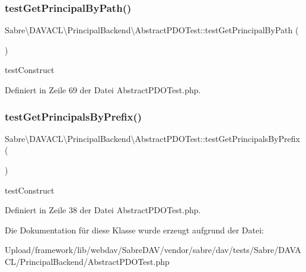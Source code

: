 \subsubsection{\texorpdfstring{test\+Get\+Principal\+By\+Path()}{testGetPrincipalByPath()}}
{\footnotesize\ttfamily Sabre\textbackslash{}\+D\+A\+V\+A\+C\+L\textbackslash{}\+Principal\+Backend\textbackslash{}\+Abstract\+P\+D\+O\+Test\+::test\+Get\+Principal\+By\+Path (\begin{DoxyParamCaption}{ }\end{DoxyParamCaption})}

test\+Construct 

Definiert in Zeile 69 der Datei Abstract\+P\+D\+O\+Test.\+php.

\mbox{\label{class_sabre_1_1_d_a_v_a_c_l_1_1_principal_backend_1_1_abstract_p_d_o_test_ae1544b19c95e8ce52959ecdf171a6b05}} 
\subsubsection{\texorpdfstring{test\+Get\+Principals\+By\+Prefix()}{testGetPrincipalsByPrefix()}}
{\footnotesize\ttfamily Sabre\textbackslash{}\+D\+A\+V\+A\+C\+L\textbackslash{}\+Principal\+Backend\textbackslash{}\+Abstract\+P\+D\+O\+Test\+::test\+Get\+Principals\+By\+Prefix (\begin{DoxyParamCaption}{ }\end{DoxyParamCaption})}

test\+Construct 

Definiert in Zeile 38 der Datei Abstract\+P\+D\+O\+Test.\+php.



Die Dokumentation für diese Klasse wurde erzeugt aufgrund der Datei\+:\begin{DoxyCompactItemize}
\item 
Upload/framework/lib/webdav/\+Sabre\+D\+A\+V/vendor/sabre/dav/tests/\+Sabre/\+D\+A\+V\+A\+C\+L/\+Principal\+Backend/Abstract\+P\+D\+O\+Test.\+php\end{DoxyCompactItemize}

